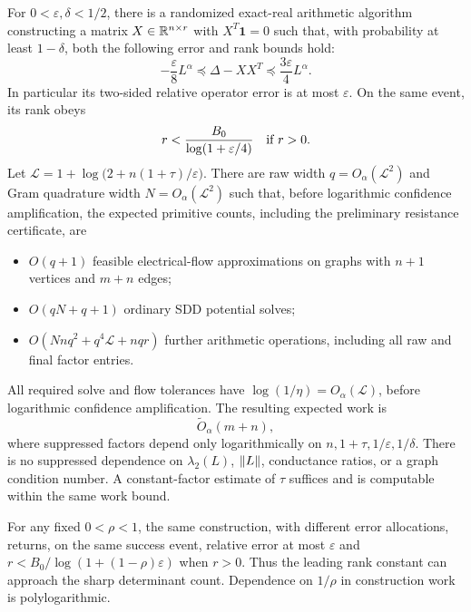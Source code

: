 \begin{theorem}
\label{alg:thm:main}
For $0<\varepsilon,\delta<1/2$, there is a randomized exact-real
arithmetic algorithm constructing a matrix $X\in\mathbb R^{n\times r}$ with
$X^T\mathbf1=0$ such that, with probability at least $1-\delta$, both the following
error and rank bounds hold:
\begin{equation}\label{alg:eq:answer}
 -\frac\varepsilon8 L^\alpha
 \preceq \Delta-XX^T
 \preceq\frac{3\varepsilon}4 L^\alpha.
\end{equation}
In particular its two-sided relative operator error is at most
$\varepsilon$. On the same event, its rank obeys
\begin{equation}\label{alg:eq:rank}
 r<\frac{B_0}{\log(1+\varepsilon/4)}
 \quad\hbox{if }r>0.
\end{equation}
Let $\mathcal L=1+\log\bigl(2+n(1+\tau)/\varepsilon\bigr)$.
There are raw width $q=O_\alpha(\mathcal L^2)$ and Gram quadrature
width $N=O_\alpha(\mathcal L^2)$ such that, before logarithmic
confidence amplification, the expected primitive counts, including
the preliminary resistance certificate, are
\begin{itemize}
\item $O(q+1)$ feasible electrical-flow approximations on graphs with
$n+1$ vertices and $m+n$ edges;
\item $O(qN+q+1)$ ordinary SDD potential solves;
\item $O(Nnq^2+q^4\mathcal L+nqr)$ further arithmetic operations, including
all raw and final factor entries.
\end{itemize}
All required solve and flow tolerances have
$\log(1/\eta)=O_\alpha(\mathcal L)$, before logarithmic confidence
amplification. The resulting expected work is
\[
 \widetilde O_\alpha(m+n),
\]
where suppressed factors depend only logarithmically on
$n,1+\tau,1/\varepsilon,1/\delta$. There is no suppressed dependence
on $\lambda_2(L)$, $\left\lVert L\right\rVert$, conductance ratios, or a graph condition
number. A constant-factor estimate of $\tau$ suffices and is computable
within the same work bound.
\end{theorem}

For any fixed $0<\rho<1$, the same construction, with different error
allocations, returns, on the same success event, relative error at most
$\varepsilon$ and
$r<B_0/\log(1+(1-\rho)\varepsilon)$ when $r>0$. Thus the leading
rank constant can approach the sharp determinant count. Dependence on
$1/\rho$ in construction work is polylogarithmic.

